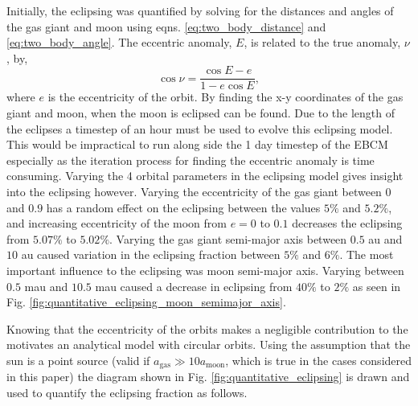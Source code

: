 \documentclass[12pt, onecolumn]{revtex4-2}    %
\begin{document}
Initially, the eclipsing was quantified by solving for the distances and angles of the gas giant and moon using eqns. \eqref{eq:two_body_distance} and \eqref{eq:two_body_angle}.
The eccentric anomaly, $E$, is related to the true anomaly, $\nu$, by,
\begin{equation}
  \cos \nu =  \frac{\cos E - e}{1 - e \cos E},
  \label{eq:true_anomaly}
\end{equation}
where $e$ is the eccentricity of the orbit.
By finding the x-y coordinates of the gas giant and moon, when the moon is eclipsed can be found.
Due to the length of the eclipses a timestep of an hour must be used to evolve this eclipsing model.
This would be impractical to run along side the 1 day timestep of the EBCM especially as the iteration process for finding the eccentric anomaly is time consuming.
Varying the 4 orbital parameters in the eclipsing model gives insight into the eclipsing however.
Varying the eccentricity of the gas giant between $0$ and $0.9$ has a random effect on the eclipsing between the values $5\%$ and $5.2\%$, and increasing eccentricity of the moon from $e=0$ to $0.1$ decreases the eclipsing from $5.07\%$ to $5.02\%$.
Varying the gas giant semi-major axis between $0.5$ au and $10$ au caused variation in the eclipsing fraction between $5\%$ and $6\%$. 
The most important influence to the eclipsing was moon semi-major axis.
Varying between $0.5$ mau and $10.5$ mau caused a decrease in eclipsing from $40\%$ to $2\%$ as seen in Fig. \ref{fig:quantitative_eclipsing_moon_semimajor_axis}.

Knowing that the eccentricity of the orbits makes a negligible contribution to the motivates an analytical model with circular orbits.
Using the assumption that the sun is a point source (valid if $a_\text{gas} \gg 10a_\text{moon}$, which is true in the cases considered in this paper) the diagram shown in Fig. \ref{fig:quantitative_eclipsing} is drawn and used to quantify the eclipsing fraction as follows.
\end{document}
